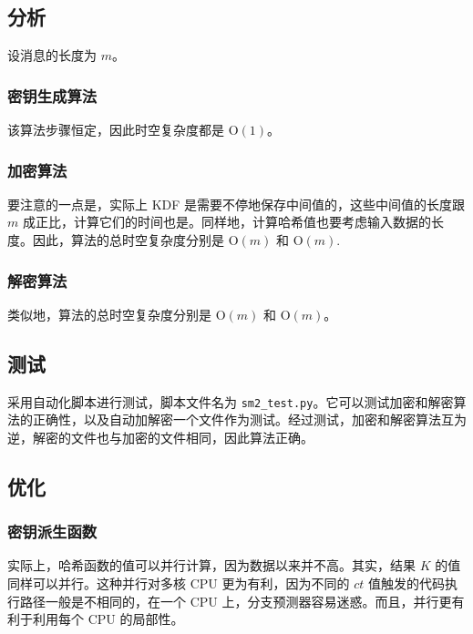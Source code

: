 \documentclass[12pt,a4paper]{article}
\begin{document}
\newpage

\subsection*{分析}

设消息的长度为 $ m $。

\subsubsection*{密钥生成算法}

该算法步骤恒定，因此时空复杂度都是 $ \mathrm{O}(1) $。

\subsubsection*{加密算法}

要注意的一点是，实际上 KDF 是需要不停地保存中间值的，这些中间值的长度跟 $ m $ 成正比，计算它们的时间也是。同样地，计算哈希值也要考虑输入数据的长度。因此，算法的总时空复杂度分别是 $ \mathrm{O}(m) $ 和 $ \mathrm{O}(m) $.

\subsubsection*{解密算法}

类似地，算法的总时空复杂度分别是 $ \mathrm{O}(m) $ 和 $ \mathrm{O}(m) $。

\subsection*{测试}

采用自动化脚本进行测试，脚本文件名为 \verb|sm2_test.py|。它可以测试加密和解密算法的正确性，以及自动加解密一个文件作为测试。经过测试，加密和解密算法互为逆，解密的文件也与加密的文件相同，因此算法正确。

\subsection*{优化}

\subsubsection*{密钥派生函数}

实际上，哈希函数的值可以并行计算，因为数据以来并不高。其实，结果 $ K $ 的值同样可以并行。这种并行对多核 CPU 更为有利，因为不同的 $ ct $ 值触发的代码执行路径一般是不相同的，在一个 CPU 上，分支预测器容易迷惑。而且，并行更有利于利用每个 CPU 的局部性。
\end{document}
